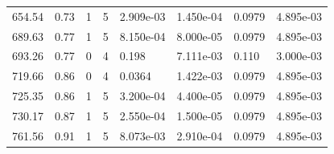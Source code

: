 \documentclass[preview]{standalone}
\begin{document}
{{\begin{tabular}{L{1.2cm}C{1.2cm} C{0.3cm}C{0.5cm} C{1.4cm}C{1.4cm} C{1.4cm}C{1.4cm}}
  654.54  &  0.73  & 1     &  5 &  2.909e-03  & 1.450e-04  & 0.0979 &  4.895e-03   \\ 
  689.63  &  0.77  & 1     &  5 &  8.150e-04  & 8.000e-05  & 0.0979 &  4.895e-03   \\ 
  693.26  &  0.77  & 0     &  4 &  0.198  & 7.111e-03  & 0.110 &  3.000e-03   \\ 
  719.66  &  0.86  & 0     &  4 &  0.0364  & 1.422e-03  & 0.0979 &  4.895e-03   \\ 
  725.35  &  0.86  & 1     &  5 &  3.200e-04  & 4.400e-05  & 0.0979 &  4.895e-03   \\ 
  730.17  &  0.87  & 1     &  5 &  2.550e-04  & 1.500e-05  & 0.0979 &  4.895e-03   \\ 
  761.56  &  0.91  & 1     &  5 &  8.073e-03  & 2.910e-04  & 0.0979 &  4.895e-03   \\ 
\hline 
\end{tabular} 

}}
\end{document}
